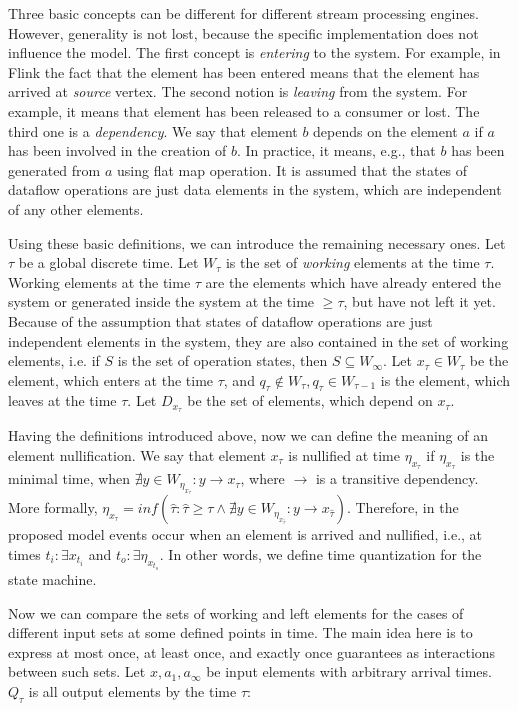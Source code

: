\documentclass[sigconf]{acmart}
\theoremstyle{remark}
\begin{document}
Three basic concepts can be different for different stream processing engines. However, generality is not lost, because the specific implementation does not influence the model. The first concept is {\em entering} to the system. For example, in Flink the fact that the element has been entered means that the element has arrived at {\em source} vertex. The second notion is {\em leaving} from the system. For example, it means that element has been released to a consumer or lost. The third one is a {\em dependency}. We say that element $b$ depends on the element $a$ if $a$ has been involved in the creation of $b$. In practice, it means, e.g., that $b$ has been generated from $a$ using flat map operation. It is assumed that the states of dataflow operations are just data elements in the system, which are independent of any other elements.

Using these basic definitions, we can introduce the remaining necessary ones. Let $\tau$ be a global discrete time. Let $W_\tau$ is the set of {\em working} elements at the time $\tau$. Working elements at the time $\tau$ are the elements which have already entered the system or generated inside the system at the time $\geqslant{\tau}$, but have not left it yet. Because of the assumption that states of dataflow operations are just independent elements in the system, they are also contained in the set of working elements, i.e. if $S$ is the set of operation states, then $S\subseteq{W_\infty}$. Let $x_\tau\in{W_\tau}$ be the element, which enters at the time $\tau$, and $q_\tau\notin{W_\tau},q_\tau\in{W_{\tau-1}}$ is the element, which leaves at the time $\tau$. Let $D_{x_{\tau}}$ be the set of elements, which depend on $x_\tau$.

Having the definitions introduced above, now we can define the meaning of an element nullification. We say that element $x_\tau$ is nullified at time $\eta_{x_{\tau}}$ if $\eta_{x_{\tau}}$ is the minimal time, when $\nexists{y\in{W_{\eta_{x_{\tau}}}}}:{y}\to{x_{\tau}}$, where $\to$ is a transitive dependency. More formally, $\eta_{x_{\tau}} = inf(\hat{\tau}:\hat{\tau}\geqslant{\tau}\land{\nexists{y\in{W_{\eta_{x_{\hat{\tau}}}}}}:{y}\to{x_{\hat{\tau}}}})$. Therefore, in the proposed model events occur when an element is arrived and nullified, i.e., at times $t_i:\exists{x_{t_i}}$ and $t_o:\exists{\eta_{x_{t_o}}}$. In other words, we define time quantization for the state machine.

Now we can compare the sets of working and left elements for the cases of different input sets at some defined points in time. The main idea here is to express at most once, at least once, and exactly once guarantees as interactions between such sets. Let $x,a_1,a_\infty$ be input elements with arbitrary arrival times. $Q_\tau$ is all output elements by the time $\tau$:
\end{document}
